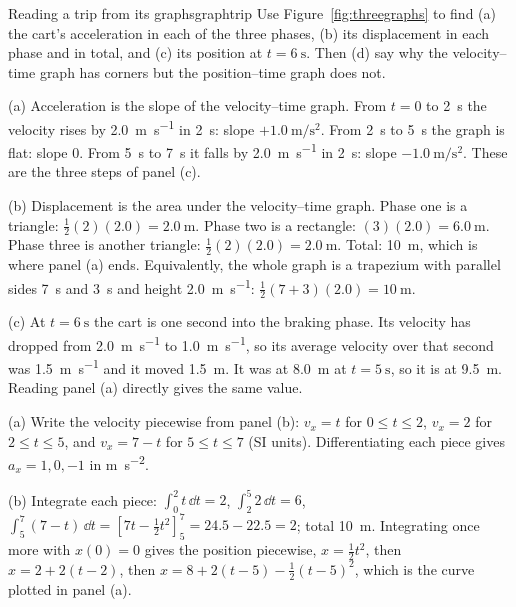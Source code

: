 \begin{example}{Reading a trip from its graphs}{graphtrip}
Use Figure~\ref{fig:threegraphs} to find (a) the cart's acceleration in each of the three phases, (b) its displacement in each phase and in total, and (c) its position at $t = \SI{6}{\second}$. Then (d) say why the velocity--time graph has corners but the position--time graph does not.

\elem (a) Acceleration is the slope of the velocity--time graph. From $t = 0$ to \SI{2}{\second} the velocity rises by \SI{2.0}{\metre\per\second} in \SI{2}{\second}: slope $+\SI{1.0}{\metre\per\second\squared}$. From \SI{2}{\second} to \SI{5}{\second} the graph is flat: slope $0$. From \SI{5}{\second} to \SI{7}{\second} it falls by \SI{2.0}{\metre\per\second} in \SI{2}{\second}: slope $\SI{-1.0}{\metre\per\second\squared}$. These are the three steps of panel (c).

(b) Displacement is the area under the velocity--time graph. Phase one is a triangle: $\tfrac12 (2)(2.0) = \SI{2.0}{\metre}$. Phase two is a rectangle: $(3)(2.0) = \SI{6.0}{\metre}$. Phase three is another triangle: $\tfrac12 (2)(2.0) = \SI{2.0}{\metre}$. Total: \SI{10}{\metre}, which is where panel (a) ends. Equivalently, the whole graph is a trapezium with parallel sides \SI{7}{\second} and \SI{3}{\second} and height \SI{2.0}{\metre\per\second}: $\tfrac12(7 + 3)(2.0) = \SI{10}{\metre}$.

(c) At $t = \SI{6}{\second}$ the cart is one second into the braking phase. Its velocity has dropped from \SI{2.0}{\metre\per\second} to \SI{1.0}{\metre\per\second}, so its average velocity over that second was \SI{1.5}{\metre\per\second} and it moved \SI{1.5}{\metre}. It was at \SI{8.0}{\metre} at $t = \SI{5}{\second}$, so it is at \SI{9.5}{\metre}. Reading panel (a) directly gives the same value.

\calc (a) Write the velocity piecewise from panel (b): $v_x = t$ for $0 \le t \le 2$, $v_x = 2$ for $2 \le t \le 5$, and $v_x = 7 - t$ for $5 \le t \le 7$ (SI units). Differentiating each piece gives $a_x = 1, 0, -1$ in \si{\metre\per\second\squared}.

(b) Integrate each piece: $\int_0^2 t\,\dd t = 2$, $\int_2^5 2\,\dd t = 6$, $\int_5^7 (7 - t)\,\dd t = [7t - \tfrac12 t^2]_5^7 = 24.5 - 22.5 = 2$; total \SI{10}{\metre}. Integrating once more with $x(0) = 0$ gives the position piecewise, $x = \tfrac12 t^2$, then $x = 2 + 2(t - 2)$, then $x = 8 + 2(t - 5) - \tfrac12 (t - 5)^2$, which is the curve plotted in panel (a).


\end{example}
